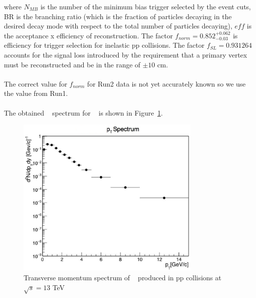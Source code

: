 where $N_{MB}$ is the number of the minimum bias trigger selected by the event cuts, BR is the branching ratio (which is the fraction of particles decaying in the desired decay mode with respect to the total number of particles decaying), $eff$ is the acceptance x efficiency of reconstruction. The factor $f_{norm}= 0.852^{+0.062}_{-0.03}$ is efficiency for trigger selection for inelastic pp collisions.  The factor $f_{SL} = 0.931264$ accounts for the signal loss introduced by the requirement that a primary vertex must be reconstructed and be in the range of  $\pm 10$ cm.
\\
\\
The correct value for $f_{norm}$ for Run2 data is not yet accurately known so we use the value from Run1. 
\\
\\
The obtained \pT~ spectrum for \kzero~ is shown in \mbox{Figure \ref{Fig:chap4-4.9}}. 

\begin{figure}[H]
\begin{center}
\includegraphics[width= 0.8\textwidth]{Images/Chapter4/k0corrected.png}
\caption{Transverse momentum spectrum of \kzero~ produced in pp collisions at $\sqrt{s}= 13$ TeV }
\label{Fig:chap4-4.9}
\end{center}
\end{figure}



